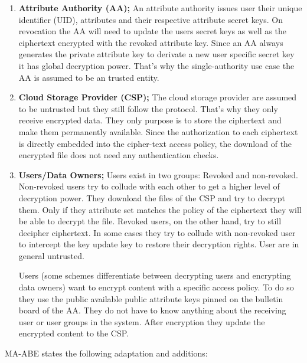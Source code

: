 \begin{enumerate}
	\item \textbf{Attribute Authority (\ac{AA});} An attribute authority issues user their unique identifier (\ac{UID}), attributes and their respective attribute secret keys. 
	On revocation the AA will need to update the users secret keys as well as the ciphertext encrypted with the revoked attribute key. 
	Since an AA always generates the private attribute key to derivate a new user specific secret key it has global decryption power. That’s why the single-authority use case the AA is assumed to be an trusted entity. 
	\item \textbf{Cloud Storage Provider (\ac{CSP});} The cloud storage provider are assumed to be untrusted but they still follow the protocol. That’s why they only receive encrypted data. They only purpose is to store the ciphertext and make them permanently available. Since the authorization to each ciphertext is directly embedded into the cipher-text access policy, the download of the encrypted file does not need any authentication checks.
	\item \textbf{Users/Data Owners;} Users exist in two groups: Revoked and non-revoked. Non-revoked users try to collude with each other to get a higher level of decryption power. They download the files of the \ac{CSP} and try to decrypt them. Only if they attribute set matches the policy of the ciphertext they will be able to decrypt the file. 
	Revoked users, on the other hand, try to still decipher ciphertext. In some cases they try to collude with non-revoked user to intercept the key update key to restore their decryption rights. 
	User are in general untrusted.

	Users (some schemes differentiate between decrypting users and encrypting data owners) want to encrypt content with a specific access policy. To do so they use the public available public attribute keys pinned on the bulletin board of the \ac{AA}. They do not have to know anything about the receiving user or user groups in the system. After encryption they update the encrypted content to the \ac{CSP}.
\end{enumerate} 

MA-ABE states the following adaptation and additions:

